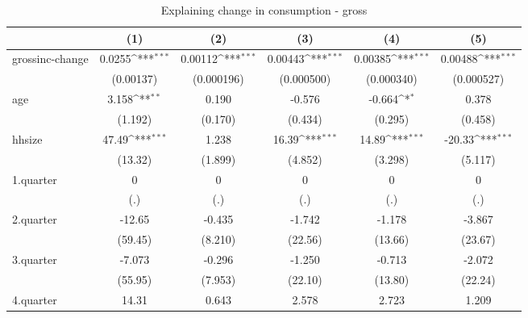 \begin{table}[!h]\centering
\def\sym#1{\ifmmode^{#1}\else\(^{#1}\)\fi}
\caption{\label{tab:2.1B-deltacons-gross} Explaining change in consumption - gross}
\begin{tabular}{l*{5}{c}}
\hline\hline
            &\multicolumn{1}{c}{(1)}         &\multicolumn{1}{c}{(2)}         &\multicolumn{1}{c}{(3)}         &\multicolumn{1}{c}{(4)}         &\multicolumn{1}{c}{(5)}         \\
\hline
grossinc-change&      0.0255\sym{***}&     0.00112\sym{***}&     0.00443\sym{***}&     0.00385\sym{***}&     0.00488\sym{***}\\
            &   (0.00137)         &  (0.000196)         &  (0.000500)         &  (0.000340)         &  (0.000527)         \\
age         &       3.158\sym{**} &       0.190         &      -0.576         &      -0.664\sym{*}  &       0.378         \\
            &     (1.192)         &     (0.170)         &     (0.434)         &     (0.295)         &     (0.458)         \\
hhsize      &       47.49\sym{***}&       1.238         &       16.39\sym{***}&       14.89\sym{***}&      -20.33\sym{***}\\
            &     (13.32)         &     (1.899)         &     (4.852)         &     (3.298)         &     (5.117)         \\
1.quarter   &           0         &           0         &           0         &           0         &           0         \\
            &         (.)         &         (.)         &         (.)         &         (.)         &         (.)         \\
2.quarter   &      -12.65         &      -0.435         &      -1.742         &      -1.178         &      -3.867         \\
            &     (59.45)         &     (8.210)         &     (22.56)         &     (13.66)         &     (23.67)         \\
3.quarter   &      -7.073         &      -0.296         &      -1.250         &      -0.713         &      -2.072         \\
            &     (55.95)         &     (7.953)         &     (22.10)         &     (13.80)         &     (22.24)         \\
4.quarter   &       14.31         &       0.643         &       2.578         &       2.723         &       1.209         \\

\end{tabular}
\end{table}
